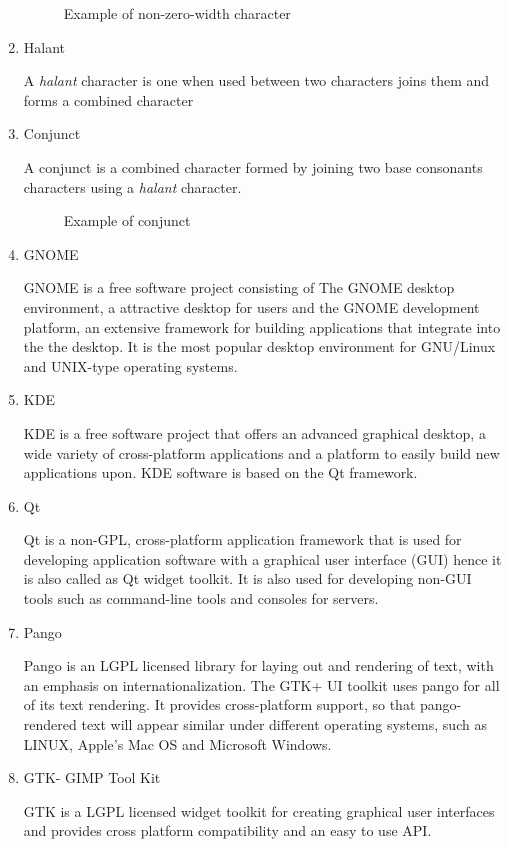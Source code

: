 \begin{enumerate}
\begin{figure}[htbp]
\centerline{}
\caption{Example of non-zero-width character} \label{Gnome Terminal17}
\end{figure}

\item Halant

A \textit{halant} character is one when used between two characters joins them and forms a combined character

\item Conjunct

A conjunct is a combined character formed by joining two base consonants characters using a \textit{halant} character.

\begin{figure}[htbp]
\centerline{}
\caption{Example of conjunct} \label{Gnome Terminal18}
\end{figure}

\item GNOME

GNOME is a free software project consisting of The GNOME desktop environment, a attractive desktop for users and the GNOME development platform, an extensive framework for building applications that integrate into the the desktop. It is the most popular desktop environment for GNU\slash Linux and UNIX-type operating systems.

\item KDE

KDE is a free software project that offers an advanced graphical desktop, a wide variety of cross-platform applications and a platform to easily build new applications upon. KDE software is based on the Qt framework.

\item Qt

Qt is a non-GPL, cross-platform application framework that is used for developing application software with a graphical user interface (GUI) hence it is also called as Qt widget toolkit. It is also used for developing non-GUI tools such as command-line tools and consoles for servers.

\item Pango

Pango is an LGPL licensed library for laying out and rendering of text, with an emphasis on internationalization. The GTK+ UI toolkit uses pango for all of its text rendering. It provides cross-platform support, so that pango-rendered text will appear similar under different operating systems, such as LINUX, Apple's Mac OS and Microsoft Windows.

\item GTK- GIMP Tool Kit

GTK is a LGPL licensed widget toolkit for creating graphical user interfaces and provides cross platform compatibility and an easy to use API.

\end{enumerate}